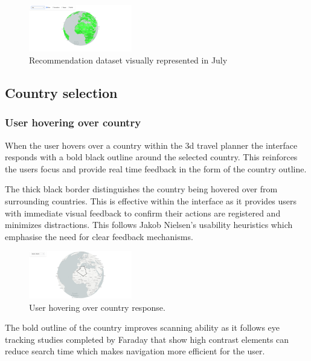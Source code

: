 \documentclass[]{project_final}
\begin{document}
\begin{figure}[ht!]
    \centering
    \includegraphics[width=0.4\textwidth]{7.png}
    \caption{Recommendation dataset visually represented in July}
    \label{fig:1}
\end{figure}

\subsection{Country selection}
\subsubsection{User hovering over country}
When the user hovers over a country within the 3d travel planner the interface responds with a bold black outline around the selected country. This reinforces the users focus and provide real time feedback in the form of the country outline.

The thick black border distinguishes the country being hovered over from surrounding countries. This is effective within the interface as it provides users with immediate visual feedback to confirm their actions are registered and minimizes distractions. This follows Jakob Nielsen's usability heuristics which emphasise the need for clear feedback mechanisms.

\begin{figure}[ht!]
    \centering
    \includegraphics[width=0.4\textwidth]{8.png}
    \caption{User hovering over country response.}
    \label{fig:1}
\end{figure}

The bold outline of the country improves scanning ability as it follows eye tracking studies completed by Faraday that show high contrast elements can reduce search time which makes navigation more efficient for the user.
\end{document}
